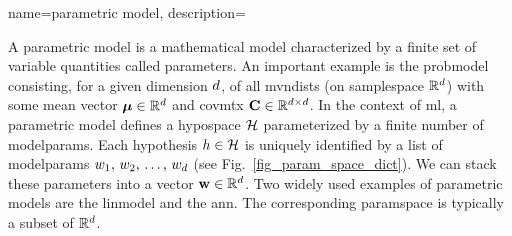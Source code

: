 {name={parametric model},
	description={A parametric \gls{model} is a mathematical \gls{model} characterized 
		by a finite set of variable quantities called \glspl{parameter}.
		An important example is the \gls{probmodel} consisting, for a given 
		\gls{dimension} $d$, of all \glspl{mvndist} (on \gls{samplespace} 
		$\mathbb{R}^{d}$) with some \gls{mean} \gls{vector} 
		${\bm \mu} \in \mathbb{R}^{d}$ and \gls{covmtx} ${\bf C} \in \mathbb{R}^{d \times d}$.
        		In the context of \gls{ml}, a parametric \gls{model} defines a 
		\gls{hypospace} $\mathcal{H}$ parameterized by a finite number of \glspl{modelparam}.
        		Each \gls{hypothesis} $h \in \mathcal{H}$ is uniquely identified by a 
		list of \glspl{modelparam} $w_{1}, \,w_{2}, \,\ldots, \,w_{d}$ 
		(see Fig.\ \ref{fig_param_space_dict}). We can stack these \glspl{parameter} into a 
		\gls{vector} ${\bf w} \in \mathbb{R}^{d}$. Two widely used examples 
		of parametric \glspl{model} are the \gls{linmodel} and the \gls{ann}. The 
		corresponding \gls{paramspace} is typically a subset of $\mathbb{R}^{d}$.
		\begin{figure}[H]
			\begin{center}
\end{center}
\end{figure}}}
